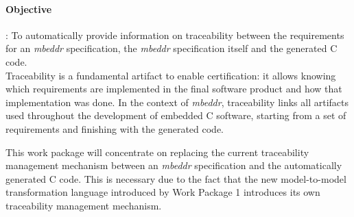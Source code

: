 \paragraph{\textbf{Objective}}: To automatically provide information on
traceability between the requirements for an \emph{mbeddr} specification, the \emph{mbeddr}
specification itself and the generated C code.\vspace{.2cm}\\
Traceability is a fundamental artifact to enable certification: it allows
knowing which requirements are implemented in the final software product and how
that implementation was done. In the context of \emph{mbeddr}, traceability links all
artifacts used throughout the development of embedded C software, starting from
a set of requirements and finishing with the generated code. 

This work package will concentrate on replacing the current traceability
management mechanism between an \emph{mbeddr} specification and the
automatically generated C code. This is necessary due to
the fact that the new model-to-model transformation language introduced by Work
Package 1 introduces its own traceability management mechanism.


